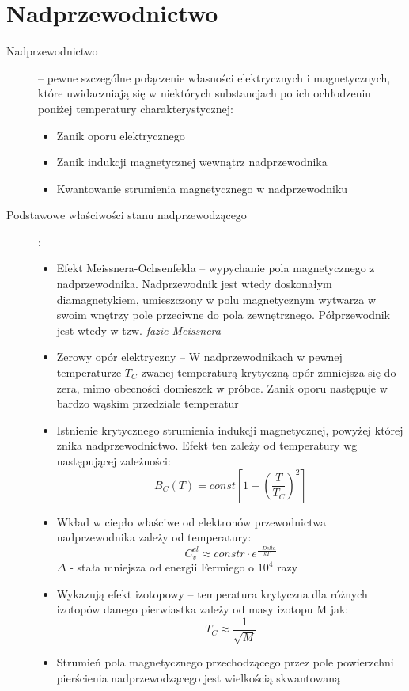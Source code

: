 \documentclass[a4paper,11pt]{article}
\begin{document}
\section{Nadprzewodnictwo}
\begin{description}
\item[Nadprzewodnictwo] -- pewne szczególne połączenie własności elektrycznych i magnetycznych, które uwidaczniają się w niektórych substancjach po ich ochłodzeniu poniżej temperatury charakterystycznej:
  \begin{itemize}
  \item Zanik oporu elektrycznego
  \item Zanik indukcji magnetycznej wewnątrz nadprzewodnika
  \item Kwantowanie strumienia magnetycznego w nadprzewodniku
  \end{itemize}
\item[Podstawowe właściwości stanu nadprzewodzącego]:\\
  \begin{itemize}
  \item Efekt Meissnera-Ochsenfelda -- wypychanie pola magnetycznego z nadprzewodnika. Nadprzewodnik jest wtedy doskonałym diamagnetykiem, umieszczony w polu magnetycznym wytwarza w swoim wnętrzy pole przeciwne do pola zewnętrznego. Półprzewodnik jest wtedy w tzw. \emph{fazie Meissnera}
  \item Zerowy opór elektryczny -- W nadprzewodnikach w pewnej temperaturze $T_C$ zwanej temperaturą krytyczną opór zmniejsza się do zera, mimo obecności domieszek w próbce. Zanik oporu następuje w bardzo wąskim przedziale temperatur
  \item Istnienie krytycznego strumienia indukcji magnetycznej, powyżej której znika nadprzewodnictwo. Efekt ten zależy od temperatury wg następującej zależności: 
    $$B_C(T) = const\left[1-\left(\frac{T}{T_C}\right)^2\right]$$
  \item Wkład w ciepło właściwe od elektronów przewodnictwa nadprzewodnika zależy od temperatury:
    $$C^{el}_v \approx constr \cdot e^\frac{-Delta}{kT}$$
    $\Delta$ - stała mniejsza od energii Fermiego o $10^4$ razy
  \item Wykazują efekt izotopowy -- temperatura krytyczna dla różnych izotopów danego pierwiastka zależy od masy izotopu M jak:
    $$T_C\approx \frac{1}{\sqrt{M}}$$
  \item Strumień pola magnetycznego przechodzącego przez pole powierzchni pierścienia nadprzewodzącego jest wielkością skwantowaną
  \end{itemize}

\end{description}
\end{document}
